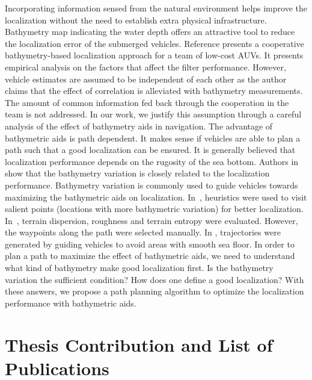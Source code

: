 Incorporating information sensed from the natural environment helps improve the localization without the need to establish extra physical infrastructure. Bathymetry map indicating the water depth offers an attractive tool to reduce the localization error of the submerged vehicles. Reference \cite{William2015Journal} presents a cooperative bathymetry-based localization approach for a team of low-cost AUVs. It presents empirical analysis on the factors that affect the filter performance. However, vehicle estimates are assumed to be independent of each other as the author claims that the effect of correlation is alleviated with bathymetry measurements. The amount of common information fed back through the cooperation in the team is not addressed. In our work, we justify this assumption through a careful analysis of the effect of bathymetry aids in navigation. The advantage of bathymetric aids is path dependent. It makes sense if vehicles are able to plan a path such that a good localization can be ensured. It is generally believed that localization performance depends on the rugosity of the sea bottom. Authors in \cite{Kalyan2013} show that the bathymetry variation is closely related to the localization performance. Bathymetry variation is commonly used to guide vehicles towards maximizing the bathymetric aids on localization. In~\cite{Galceran2013}, heuristics were used to visit salient points (locations with more bathymetric variation) for better localization. In~\cite{Peng2016}, terrain dispersion, roughness and terrain entropy were evaluated. However, the waypoints along the path were selected manually. In \cite{Rodrigo2015}, trajectories were generated by guiding vehicles to avoid areas with smooth sea floor. In order to plan a path to maximize the effect of bathymetric aids, we need to understand what kind of bathymetry make good localization first. Is the bathymetry variation the sufficient condition? How does one define a good localization? With these answers, we propose a path planning algorithm to optimize the localization performance with bathymetric aids.

\section{Thesis Contribution and List of Publications}
\label{sec:Publication}

